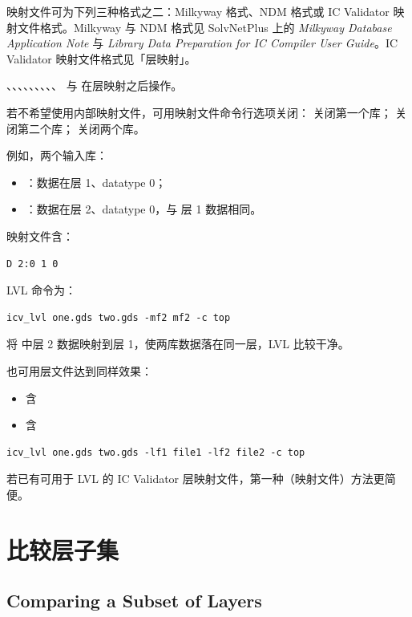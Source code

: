 映射文件可为下列三种格式之二：Milkyway 格式、NDM 格式或 IC Validator 映射文件格式。Milkyway 与 NDM 格式见 SolvNetPlus 上的 \textit{Milkyway Database Application Note} 与 \textit{Library Data Preparation for IC Compiler User Guide}。IC Validator 映射文件格式见「层映射」。

、、、、、、、、、 与  在层映射之后操作。

若不希望使用内部映射文件，可用映射文件命令行选项关闭： 关闭第一个库； 关闭第二个库； 关闭两个库。

例如，两个输入库：
\begin{itemize}
  \item {}：数据在层 1、datatype 0；
  \item {}：数据在层 2、datatype 0，与  层 1 数据相同。
\end{itemize}

 映射文件含：
\begin{lstlisting}
D 2:0 1 0
\end{lstlisting}

LVL 命令为：
\begin{lstlisting}
icv_lvl one.gds two.gds -mf2 mf2 -c top
\end{lstlisting}

 将  中层 2 数据映射到层 1，使两库数据落在同一层，LVL 比较干净。

也可用层文件达到同样效果：
\begin{itemize}
  \item {} 含 
  \item {} 含 
\end{itemize}

\begin{lstlisting}
icv_lvl one.gds two.gds -lf1 file1 -lf2 file2 -c top
\end{lstlisting}

若已有可用于 LVL 的 IC Validator 层映射文件，第一种（映射文件）方法更简便。

\section{比较层子集}
\subsection*{Comparing a Subset of Layers}

